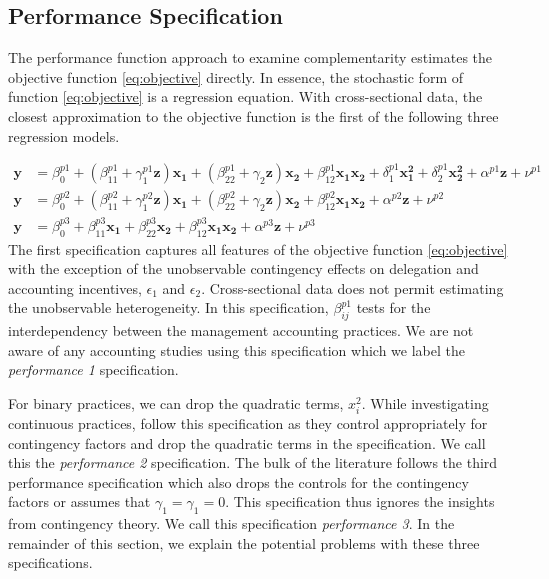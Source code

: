 \documentclass[12pt]{article}
\begin{document}
\subsection{Performance Specification}

The performance function approach to examine complementarity estimates the objective function \eqref{eq:objective} directly. In essence, the stochastic form of function \eqref{eq:objective} is a regression equation. With cross-sectional data, the closest approximation to the objective function is the first of the following three regression models.  

\begin{align*}
\mathbf{y} &=  \beta^{p1}_0 + (\beta^{p1}_{11} + \gamma_1^{p1} \mathbf{z} )\mathbf{x_1} 
						+ (\beta_{22}^{p1} + \gamma_2 \mathbf{z} ) \mathbf{x_2} 
                        + \beta_{12}^{p1} \mathbf{x_1} \mathbf{x_2} 
                        + \delta_1^{p1} \mathbf{x^2_1} + \delta_2^{p1} \mathbf{x^2_2} 
                        + \alpha^{p1} \mathbf{z}
                        + \nu^{p1} \\
 \mathbf{y} &=  \beta^{p2}_0 + (\beta^{p2}_{11} + \gamma_1^{p2} \mathbf{z} )\mathbf{x_1} 
						+ (\beta_{22}^{p2} + \gamma_2 \mathbf{z} ) \mathbf{x_2} 
                        + \beta_{12}^{p2} \mathbf{x_1} \mathbf{x_2} 
                        + \alpha^{p2} \mathbf{z}
                        + \nu^{p2} \\
 \mathbf{y} &=  \beta^{p3}_0 + \beta^{p3}_{11} \mathbf{x_1} 
						+ \beta_{22}^{p3} \mathbf{x_2} 
                        + \beta_{12}^{p3} \mathbf{x_1} \mathbf{x_2} 
                        + \alpha^{p3} \mathbf{z}
                        + \nu^{p3}
\end{align*}
The first specification captures all features of the objective function \eqref{eq:objective} with the exception of the unobservable contingency effects on delegation and accounting incentives, $\epsilon_1$ and $\epsilon_2$. Cross-sectional data does not permit estimating the unobservable heterogeneity. In this specification, \(\beta_{ij}^{p1}\) tests for the interdependency between the management accounting practices. We are not aware of any accounting studies using this specification which we label the \emph{performance 1} specification. 

For binary practices, we can drop the quadratic terms, $x_i^2$.  While investigating continuous practices, \citet{ bedford_management_2016, bedford_performance_2019} follow this specification as they control appropriately for contingency factors and drop the quadratic terms in the specification. We call this the \emph{performance 2} specification. The bulk of the literature follows the third performance specification which also drops the controls for the contingency factors or assumes that $\gamma_1 = \gamma_1 = 0$. This specification thus ignores the insights from contingency theory. We call this specification \emph{performance 3}. In the remainder of this section, we explain the potential problems with these three specifications.
\end{document}
